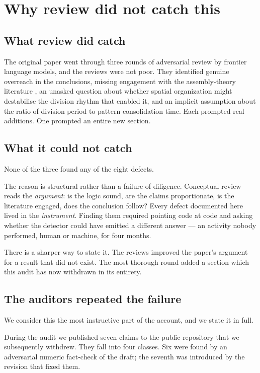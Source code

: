 \documentclass[11pt,letterpaper]{article}
\begin{document}
\section{Why review did not catch this}

\subsection{What review did catch}

The original paper went through three rounds of adversarial review by
frontier language models, and the reviews were not poor. They identified
genuine overreach in the conclusions, missing engagement with the
assembly-theory literature \citep{marshall2021}, an unasked question about whether spatial
organization might destabilise the division rhythm that enabled it, and
an implicit assumption about the ratio of division period to
pattern-consolidation time. Each prompted real additions. One prompted
an entire new section.

\subsection{What it could not catch}

None of the three found any of the eight defects.

The reason is structural rather than a failure of diligence. Conceptual
review reads the \emph{argument}: is the logic sound, are the claims
proportionate, is the literature engaged, does the conclusion follow?
Every defect documented here lived in the \emph{instrument}. Finding
them required pointing code at code and asking whether the detector
could have emitted a different answer --- an activity nobody performed,
human or machine, for four months.

There is a sharper way to state it. The reviews improved the paper's
argument for a result that did not exist. The most thorough round added
a section which this audit has now withdrawn in its entirety.

\subsection{The auditors repeated the failure}
\label{sec:auditors}

We consider this the most instructive part of the account, and we state
it in full.

During the audit we published seven claims to the public repository
that we subsequently withdrew. They fall into four classes. Six were
found by an adversarial numeric fact-check of the draft; the seventh was
introduced by the revision that fixed them.
\end{document}
